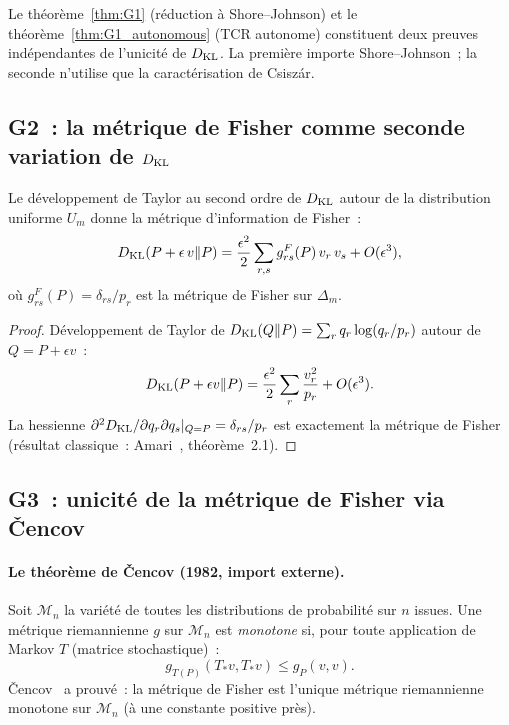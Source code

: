 \documentclass[12pt,a4paper]{article}
\begin{document}
\begin{remarque}
Le théorème~\ref{thm:G1} (réduction à Shore--Johnson) et le
théorème~\ref{thm:G1_autonomous} (TCR autonome) constituent deux
preuves indépendantes de l'unicité de $D_{\mathrm{KL}}$. La première importe
Shore--Johnson~; la seconde n'utilise que la caractérisation de
Csisz\'ar.
\end{remarque}

\subsection{G2~: la métrique de Fisher comme seconde variation de $D_{\mathrm{KL}}$}
\label{sec:G2}

\mTHM
\begin{theoreme}
\label{thm:G2}
Le développement de Taylor au second ordre de $D_{\mathrm{KL}}$ autour de la
distribution uniforme $U_m$ donne la métrique d'information de Fisher~:
\[
  D_{\mathrm{KL}}(P + \epsilon\, v \| P) = \frac{\epsilon^2}{2} \sum_{r,s}
  g_{rs}^F(P)\, v_r\, v_s + O(\epsilon^3),
\]
où $g_{rs}^F(P) = \delta_{rs}/p_r$ est la métrique de Fisher sur
$\Delta_m$.

\begin{proof}
Développement de Taylor de $D_{\mathrm{KL}}(Q\|P) = \sum_r q_r \log(q_r/p_r)$
autour de $Q = P + \epsilon v$~:
\[
  D_{\mathrm{KL}}(P+\epsilon v \| P) = \frac{\epsilon^2}{2} \sum_r \frac{v_r^2}{p_r}
  + O(\epsilon^3).
\]
La hessienne
$\partial^2 D_{\mathrm{KL}} / \partial q_r \partial q_s |_{Q=P} = \delta_{rs}/p_r$
est exactement la métrique de Fisher (résultat classique~:
Amari~\cite{Amari1985}, théorème~2.1).
\end{proof}
\end{theoreme}

\subsection{G3~: unicité de la métrique de Fisher via \v Cencov}
\label{sec:G3}

\paragraph{Le théorème de \v Cencov (1982, import externe).}
Soit $\mathcal{M}_n$ la variété de toutes les distributions de
probabilité sur $n$ issues. Une métrique riemannienne $g$ sur
$\mathcal{M}_n$ est \emph{monotone} si, pour toute application de
Markov $T$ (matrice stochastique)~:
\[
  g_{T(P)}(T_* v, T_* v) \leq g_P(v, v).
\]
\v{C}encov~\cite{Cencov1982} a prouvé~: la métrique de Fisher est
l'unique métrique riemannienne monotone sur $\mathcal{M}_n$ (à une
constante positive près).
\end{document}
